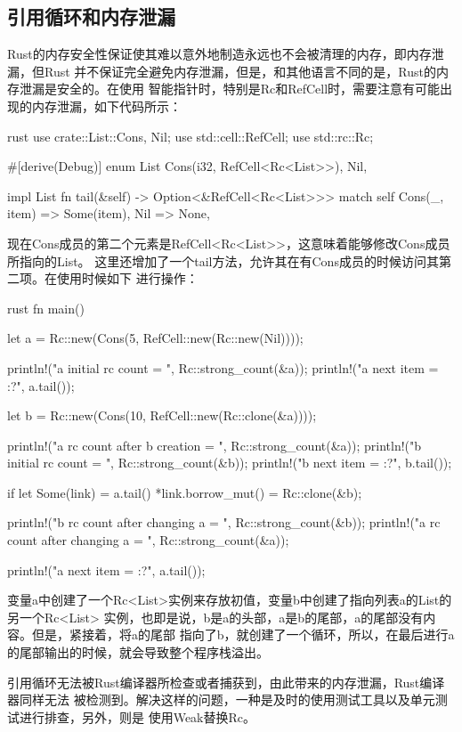 \subsection{引用循环和内存泄漏}
Rust的内存安全性保证使其难以意外地制造永远也不会被清理的内存，即内存泄漏，但Rust
并不保证完全避免内存泄漏，但是，和其他语言不同的是，Rust的内存泄漏是安全的。在使用
智能指针时，特别是Rc和RefCell时，需要注意有可能出现的内存泄漏，如下代码所示：
\begin{code-block}{rust}
use crate::List::{Cons, Nil};
use std::cell::RefCell;
use std::rc::Rc;

#[derive(Debug)]
enum List {
    Cons(i32, RefCell<Rc<List>>),
    Nil,
}

impl List {
    fn tail(&self) -> Option<&RefCell<Rc<List>>> {
        match self {
            Cons(_, item) => Some(item),
            Nil => None,
        }
    }
}
\end{code-block}
现在Cons成员的第二个元素是RefCell<Rc<List>>，这意味着能够修改Cons成员所指向的List。
这里还增加了一个tail方法，允许其在有Cons成员的时候访问其第二项。在使用时候如下
进行操作：
\begin{code-block}{rust}
fn main() {
    let a = Rc::new(Cons(5, RefCell::new(Rc::new(Nil))));

    println!("a initial rc count = {}", Rc::strong_count(&a));
    println!("a next item = {:?}", a.tail());

    let b = Rc::new(Cons(10, RefCell::new(Rc::clone(&a))));

    println!("a rc count after b creation = {}", Rc::strong_count(&a));
    println!("b initial rc count = {}", Rc::strong_count(&b));
    println!("b next item = {:?}", b.tail());

    if let Some(link) = a.tail() {
        *link.borrow_mut() = Rc::clone(&b);
    }

    println!("b rc count after changing a = {}", Rc::strong_count(&b));
    println!("a rc count after changing a = {}", Rc::strong_count(&a));

    println!("a next item = {:?}", a.tail());
}
\end{code-block}
变量a中创建了一个Rc<List>实例来存放初值，变量b中创建了指向列表a的List的另一个Rc<List>
实例，也即是说，b是a的头部，a是b的尾部，a的尾部没有内容。但是，紧接着，将a的尾部
指向了b，就创建了一个循环，所以，在最后进行a的尾部输出的时候，就会导致整个程序栈溢出。

引用循环无法被Rust编译器所检查或者捕获到，由此带来的内存泄漏，Rust编译器同样无法
被检测到。解决这样的问题，一种是及时的使用测试工具以及单元测试进行排查，另外，则是
使用Weak替换Rc。

